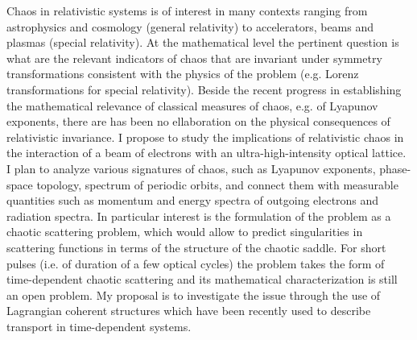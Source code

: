 \documentclass[11pt,a4paper,final]{moderncv}
\begin{document}
Chaos in relativistic systems is of interest in many contexts ranging from astrophysics and cosmology (general relativity)
to accelerators, beams and plasmas (special relativity). At the mathematical level the pertinent question is what
are the relevant indicators of chaos that are invariant under symmetry transformations consistent with the physics of
the problem (e.g. Lorenz transformations for special relativity). Beside the recent progress in establishing the mathematical 
relevance of classical measures of chaos, e.g. of Lyapunov exponents, there are has been no ellaboration on the physical
consequences of relativistic invariance. I propose to study the implications of relativistic chaos in the interaction of
a beam of electrons with an ultra-high-intensity optical lattice. I plan to analyze various signatures of chaos, such as
Lyapunov exponents, phase-space topology, spectrum of periodic orbits, and connect them with measurable quantities such
as momentum and energy spectra of outgoing electrons and radiation spectra. In particular interest is the formulation of
the problem as a chaotic scattering problem, which would allow to predict singularities in scattering functions in terms of
the structure of the chaotic saddle. For short pulses (i.e. of duration of a few optical cycles)
the problem takes the form of time-dependent chaotic scattering and its mathematical characterization is still an open
problem. My proposal is to investigate the issue through the use of Lagrangian coherent structures which have been recently used
to describe transport in time-dependent systems.
\\ \\ \\ 


\end{document}
